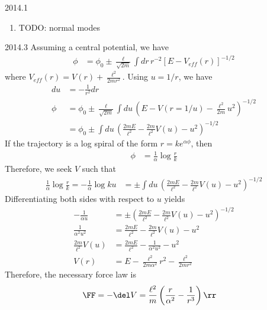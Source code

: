 \documentclass[12pt]{article}
\begin{document}
\begin{solution}{2014.1}
\begin{enumerate}
\item
TODO: normal modes

\end{enumerate}

\end{solution}




\begin{solution}{2014.3}
Assuming a central potential, we have
\begin{align*}
\phi & = \phi_0 \pm \frac{\ell}{\sqrt{2m}} \int dr \, r^{-2} [E - V_{eff}(r)]^{-1/2}
\end{align*}
where $V_{eff}(r) = V(r) + \frac{\ell^2}{2mr^2}$. Using $u = 1/r$, we have
\begin{align*}
du & = -\frac{1}{r^2} dr \\
\phi & = \phi_0 \pm \frac{\ell}{\sqrt{2m}} \int du \, \left( E - V(r=1/u) - \frac{\ell^2}{2m} u^2 \right)^{-1/2} \\
& = \phi_0 \pm \int du \, \left( \frac{2mE}{\ell^2} - \frac{2m}{\ell^2} V(u) - u^2 \right)^{-1/2}
\end{align*}
If the trajectory is a log spiral of the form $r = k e^{\alpha \phi}$, then
\begin{align*}
\phi & = \frac{1}{\alpha} \log \frac{r}{k}
\end{align*}
Therefore, we seek $V$ such that
\begin{align*}
\frac{1}{\alpha} \log \frac{r}{k} = -\frac{1}{\alpha} \log ku 
& = \pm \int du \, \left( \frac{2mE}{\ell^2} - \frac{2m}{\ell^2} V(u) - u^2 \right)^{-1/2}
\end{align*}
Differentiating both sides with respect to $u$ yields
\begin{align*}
-\frac{1}{\alpha u} & = \pm \left( \frac{2mE}{\ell^2} - \frac{2m}{\ell^2} V(u) - u^2 \right)^{-1/2} \\
\frac{1}{\alpha^2 u^2} & = \frac{2mE}{\ell^2} - \frac{2m}{\ell^2} V(u) - u^2 \\
\frac{2m}{\ell^2} V(u) & = \frac{2mE}{\ell^2} - \frac{1}{\alpha^2 u^2} - u^2 \\
V(r) & = E - \frac{\ell^2}{2m \alpha^2} r^2 - \frac{\ell^2}{2mr^2}
\end{align*}
Therefore, the necessary force law is
\begin{align*}
\FF & = -\del V = \frac{\ell^2}{m} \left( \frac{r}{\alpha^2} - \frac{1}{r^3} \right) \rr
\end{align*}

\end{solution}
\end{document}
